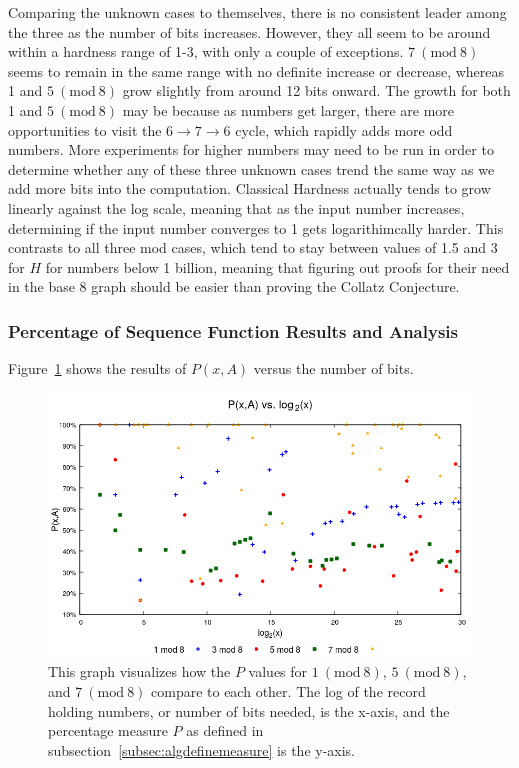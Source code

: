 \documentclass[12pt]{article}
\newcommand{\Mod}[1]{\ (\mathrm{mod}\ #1)}
\theoremstyle{definition}
\begin{document}
Comparing the unknown cases to themselves, there is no consistent leader among the three as the number of bits increases. However, they all seem to be around within a hardness range of 1-3, with only a couple of exceptions. $7 \Mod{8}$ seems to remain in the same range with no definite increase or decrease, whereas 1 and $5 \Mod{8}$ grow slightly from around 12 bits onward. The growth for both 1 and $5 \Mod{8}$ may be because as numbers get larger, there are more opportunities to visit the $6 \rightarrow 7 \rightarrow 6$ cycle, which rapidly adds more odd numbers. More experiments for higher numbers may need to be run in order to determine whether any of these three unknown cases trend the same way as we add more bits into the computation.
Classical Hardness actually tends to grow linearly against the log scale, meaning that as the input number increases, determining if the input number converges to 1 gets logarithimcally harder. This contrasts to all three mod cases, which tend to stay between values of 1.5 and 3 for $H$ for numbers below 1 billion, meaning that figuring out proofs for their need in the base 8 graph should be easier than proving the Collatz Conjecture.
\subsubsection{Percentage of Sequence Function Results and Analysis} \label{subsubsec:algsinpercentage}
 Figure~\ref{fig:pvslog} shows the results of $P(x,A)$ versus the number of bits.\par 
\begin{figure}
    \centering
    \includegraphics[scale=0.75]{ModAvoidanceAnalysisPics/P_vs_log.png}
    \caption{This graph visualizes how the $P$ values for $1 \Mod{8}$, $5 \Mod{8}$, and $7 \Mod{8}$ compare to each other. The log of the record holding numbers, or number of bits needed, is the x-axis, and the percentage measure $P$ as defined in subsection~\ref{subsec:algdefinemeasure} is the y-axis.}
    \label{fig:pvslog}
\end{figure}
\end{document}
